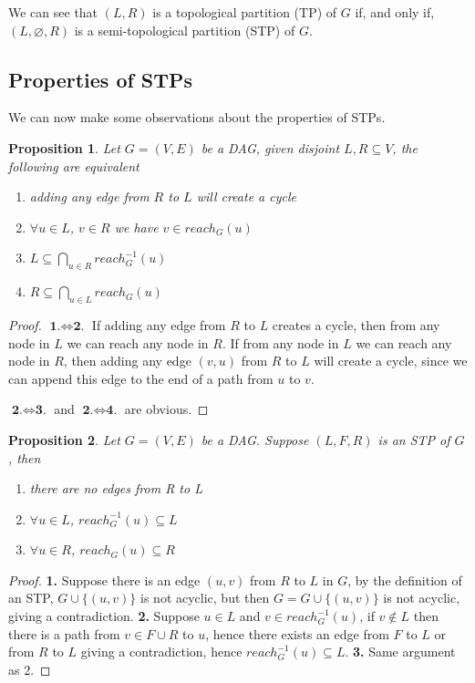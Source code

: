 \documentclass{article}
\newtheorem{proposition}{Proposition}
\begin{document}
We can see that $(L,R)$ is a topological partition (TP) of $G$ if, and only if, $(L,\varnothing,R)$ is a semi-topological partition (STP) of $G$.

\subsection{Properties of STPs}

We can now make some observations about the properties of STPs.

\begin{proposition}
Let $G=(V,E)$ be a DAG, given disjoint $L,R \subseteq V$, the following are equivalent
\begin{enumerate}
\item adding any edge from $R$ to $L$ will create a cycle
\item $\forall u \in L$, $v \in R$ we have $v \in reach_{G}(u)$
\item $L \subseteq \bigcap_{u \in R} reach_{G}^{-1}(u)$
\item $R \subseteq \bigcap_{u \in L} reach_{G}(u)$
\end{enumerate}
\end{proposition}

\begin{proof}
$\textbf{1.} \Leftrightarrow \textbf{2.}$ If adding any edge from $R$ to $L$ creates a cycle, then from any node in $L$ we can reach any node in $R$. If from any node in $L$ we can reach any node in $R$, then adding any edge $(v,u)$ from $R$ to $L$ will create a cycle, since we can append this edge to the end of a path from $u$ to $v$.

$\textbf{2.} \Leftrightarrow \textbf{3.}$ and $\textbf{2.} \Leftrightarrow \textbf{4.}$ are obvious.
\end{proof}

\begin{proposition}
Let $G=(V,E)$ be a DAG. Suppose $(L,F,R)$ is an STP of $G$, then
\begin{enumerate}
\item there are no edges from R to L
\item $\forall u \in L$, $reach_{G}^{-1}(u) \subseteq L$
\item $\forall u \in R$, $reach_{G}(u) \subseteq R$
\end{enumerate}
\end{proposition}

\begin{proof}
\textbf{1.} Suppose there is an edge $(u,v)$ from $R$ to $L$ in $G$, by the definition of an STP, $G \cup \{(u,v)\}$ is not acyclic, but then $G=G \cup \{(u,v)\}$ is not acyclic, giving a contradiction. \textbf{2.} Suppose $u \in L$ and $v \in reach_{G}^{-1}(u)$, if $v \notin L$ then there is a path from $v \in F \cup R$ to $u$, hence there exists an edge from $F$ to $L$ or from $R$ to $L$ giving a contradiction, hence $reach_{G}^{-1}(u) \subseteq L$. \textbf{3.} Same argument as 2.
\end{proof}
\end{document}
